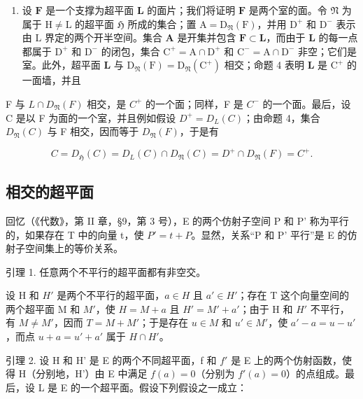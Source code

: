 \begin{enumerate}
\def\labelenumi{\arabic{enumi})}
\setcounter{enumi}{1}
\tightlist
\item
  设 \(\mathbf{F}\) 是一个支撑为超平面 \(\mathbf{L}\) 的面片；我们将证明 \(\mathbf{F}\) 是两个室的面。令 \(\mathfrak{N}\) 为属于 \(\mathrm{H} \neq \mathrm{L}\) 的超平面 \(\mathfrak{H}\) 所成的集合；置 \(\mathrm{A} = \mathrm{D}_{\mathfrak{N}}(\mathrm{F})\)，并用 \(\mathrm{D}^{+}\) 和 \(\mathrm{D}^{-}\) 表示由 \(\mathrm{L}\) 界定的两个开半空间。集合 \(\mathbf{A}\) 是开集并包含 \(\mathbf{F} \subset \mathbf{L}\)，而由于 \(\mathbf{L}\) 的每一点都属于 \(\mathrm{D}^{+}\) 和 \(\mathrm{D}^{-}\) 的闭包，集合 \(\mathrm{C}^{+} = \mathrm{A} \cap \mathrm{D}^{+}\) 和 \(\mathrm{C}^{-} = \mathrm{A} \cap \mathrm{D}^{-}\) 非空；它们是室。此外，超平面 \(\mathbf{L}\) 与 \(\mathrm{D}_{\mathfrak{N}}(\mathrm{F}) = \mathrm{D}_{\mathfrak{N}}(\mathrm{C}^{+})\) 相交；命题 4 表明 \(\mathbf{L}\) 是 \(\mathrm{C}^{+}\) 的一面墙，并且
\end{enumerate}

F 与 \(L \cap D_{\mathfrak{N}}(F)\) 相交，是 \(C^{+}\) 的一个面；同样，F 是 \(C^{-}\) 的一个面。最后，设 C 是以 F 为面的一个室，并且例如假设 \(D^{+} = D_{L}(C)\)；由命题 4，集合 \(D_{\mathfrak{N}}(C)\) 与 F 相交，因而等于 \(D_{\mathfrak{N}}(F)\)，于是有

\[
C = D _ {\mathfrak {H}} (C) = D _ {L} (C) \cap D _ {\mathfrak {N}} (C) = D ^ {+} \cap D _ {\mathfrak {N}} (F) = C ^ {+}.
\]

\subsection{相交的超平面}

回忆（《代数》，第 II 章，§9，第 3 号），E 的两个仿射子空间 P 和 P' 称为平行的，如果存在 T 中的向量 t，使 \(P' = t + P\)。显然，关系“P 和 P' 平行”是 E 的仿射子空间集上的等价关系。

引理 1. 任意两个不平行的超平面都有非空交。

设 H 和 \(H'\) 是两个不平行的超平面，\(a \in H\) 且 \(a' \in H'\)；存在 T 这个向量空间的两个超平面 M 和 \(M'\)，使 \(H = M + a\) 且 \(H' = M' + a'\)；由于 H 和 \(H'\) 不平行，有 \(M \neq M'\)，因而 \(T = M + M'\)；于是存在 \(u \in M\) 和 \(u' \in M'\)，使 \(a' - a = u - u'\)，而点 \(u + a = u' + a'\) 属于 \(H \cap H'\)。

引理 2. 设 H 和 H' 是 E 的两个不同超平面，f 和 \(f'\) 是 E 上的两个仿射函数，使得 H（分别地，H'）由 E 中满足 \(f(a) = 0\)（分别为 \(f'(a) = 0\)）的点组成。最后，设 L 是 E 的一个超平面。假设下列假设之一成立：

